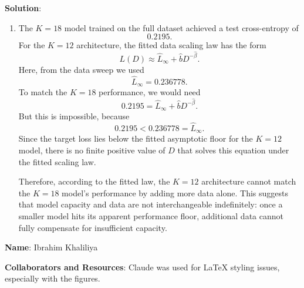 \documentclass[submit]{harvardml}
\newenvironment{solution}{
    \vspace{2mm}
    \color{blue}\noindent\textbf{Solution}:
}{}
\begin{document}
\begin{solution}
\begin{enumerate}
\begin{enumerate}
        \item The $K=18$ model trained on the full dataset achieved a test cross-entropy of
        \[
        0.2195.
        \]
        For the $K=12$ architecture, the fitted data scaling law has the form
        \[
        L(D) \approx \hat L_\infty + \hat b D^{-\hat\beta}.
        \]
        Here, from the data sweep we used
        \[
        \hat L_\infty = 0.236778.
        \]
        To match the $K=18$ performance, we would need
        \[
        0.2195 = \hat L_\infty + \hat b D^{-\hat\beta}.
        \]
        But this is impossible, because
        \[
        0.2195 < 0.236778 = \hat L_\infty.
        \]
        Since the target loss lies below the fitted asymptotic floor for the $K=12$ model, there is no finite positive value of $D$ that solves this equation under the fitted scaling law.

        Therefore, according to the fitted law, the $K=12$ architecture cannot match the $K=18$ model's performance by adding more data alone. This suggests that model capacity and data are not interchangeable indefinitely: once a smaller model hits its apparent performance floor, additional data cannot fully compensate for insufficient capacity.
    \end{enumerate}
\end{enumerate}
\end{solution}

\newpage



\textbf{Name}: Ibrahim Khaliliya

\textbf{Collaborators and Resources}: Claude was used for LaTeX styling issues, especially with the figures.
\end{document}
